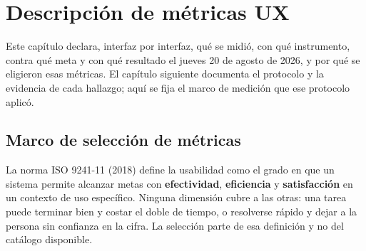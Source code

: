 %
%

\section{Descripción de métricas UX}
\label{sec:a5-metricas}

Este capítulo declara, interfaz por interfaz, qué se midió, con qué instrumento, contra qué meta y
con qué resultado el jueves 20 de agosto de 2026, y por qué se eligieron esas métricas. El
capítulo siguiente documenta el protocolo y la evidencia de cada hallazgo; aquí se fija el marco
de medición que ese protocolo aplicó.

\subsection{Marco de selección de métricas}

La norma ISO 9241-11 (2018) define la usabilidad como el grado en que un sistema permite alcanzar
metas con \textbf{efectividad}, \textbf{eficiencia} y \textbf{satisfacción} en un contexto de uso
específico. Ninguna dimensión cubre a las otras: una tarea puede terminar bien y costar el doble
de tiempo, o resolverse rápido y dejar a la persona sin confianza en la cifra. La selección parte
de esa definición y no del catálogo disponible.

